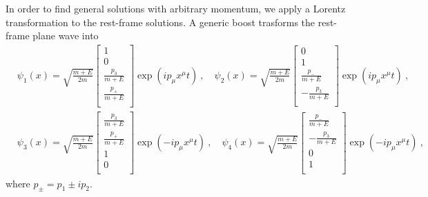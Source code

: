     In order to find general solutions with arbitrary momentum, we apply a Lorentz transformation to the rest-frame solutions. A generic boost trasforms the rest-frame plane wave into 
    \begin{equation*}
    \begin{aligned}
        & \psi_1(x) = \sqrt{\frac{m + E}{2m}} \begin{bmatrix}
            1 \\ 0 \\ \frac{p_3}{m+E} \\ \frac{p_+}{m+E} \\
        \end{bmatrix} \exp(ip_\mu x^\mu t) ~, \quad \psi_2(x) = \sqrt{\frac{m + E}{2m}} \begin{bmatrix}
            0 \\ 1 \\ \frac{p_-}{m + E} \\ - \frac{p_3}{m + E} \\
        \end{bmatrix} \exp(ip_\mu x^\mu t) ~, \\ & 
        \psi_3(x) = \sqrt{\frac{m + E}{2m}} \begin{bmatrix}
            \frac{p_3 }{m+E}\\ \frac{p_+}{m+E} \\ 1 \\ 0 \\
        \end{bmatrix} \exp(-ip_\mu x^\mu t) ~, \quad \psi_4(x) = \sqrt{\frac{m + E}{2m}} \begin{bmatrix}
            \frac{p_- }{m+E}\\ - \frac{p_3}{m+E} \\ 0 \\ 1 \\
        \end{bmatrix} \exp(-ip_\mu x^\mu t) ~,
    \end{aligned}
    \end{equation*}
    where $p_\pm = p_1 \pm i p_2$. 
